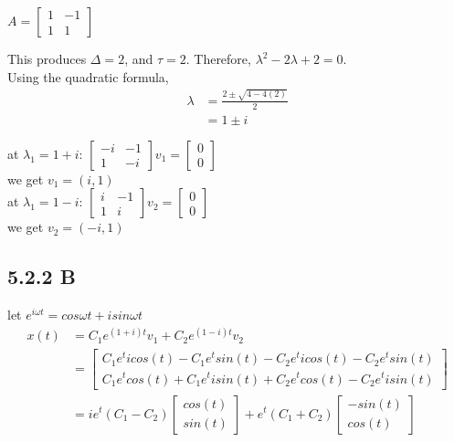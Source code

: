 \documentclass[]{article}
\begin{document}
	\begin{math}
	A =  
	\begin{bmatrix}
	1 & -1 \\
	1 & 1
	\end{bmatrix}
	\end{math}
	
	This produces $\Delta = 2$, and $\tau = 2$. Therefore, $\lambda^2 - 2\lambda + 2 = 0$.\\
	Using the quadratic formula,
	\begin{align*}
	\lambda &= \frac{2 \pm \sqrt{4 - 4(2)}}{2}\\
	&= 1 \pm i
	\end{align*}
	
	
	at $\lambda_1 = 1 + i$:
	\begin{math}
	\begin{bmatrix}
	-i & -1 \\
	1 & -i
	\end{bmatrix}
	v_1 =
	\begin{bmatrix}
	0\\
	0
	\end{bmatrix}
	\end{math}\\
	we get $v_1 = (i, 1)$
	\\
	
	at $\lambda_1 = 1 - i$: 
	\begin{math}
	\begin{bmatrix}
	i & -1 \\
	1 & i
	\end{bmatrix}
	v_2 =
	\begin{bmatrix}
	0\\
	0
	\end{bmatrix}
	\end{math}\\
	we get $v_2 = (-i, 1)$\\
	
	\subsection*{5.2.2 B}
	let $e^{i\omega t} = cos \omega t + i sin \omega t$\\
	\begin{align*}
	x(t) &= C_1 e^{(1 + i)t}v_1 + C_2 e^{(1 - i)t}v_2\\
	& = \begin{bmatrix}
	C_1 e^t i cos (t) - C_1 e^t sin (t) - C_2 e^t i cos (t) - C_2 e^t sin (t) \\
	C_1 e^t cos (t) + C_1 e^t i sin (t) + C_2 e^t cos (t) - C_2 e^t i sin (t)
	\end{bmatrix}\\
	& = i e^t (C_1 - C_2)
	\begin{bmatrix}
	cos (t) \\
	sin (t)
	\end{bmatrix}
	+ e^t (C_1 + C_2)
	\begin{bmatrix}
	-sin (t)\\
	cos (t)
	\end{bmatrix}
	\end{align*}\\
	
\end{document}
